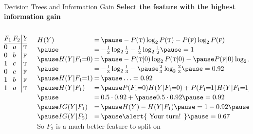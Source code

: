 \documentclass[12pt]{beamer}
\newcommand{\key}[1]{{\color{blue}#1}}
\newcommand{\SC}[1]{\mbox{\sc#1}}
\begin{document}
\begin{frame}{Decision Trees and Information Gain}
	\textbf{\key{Select the feature with the highest information gain}}
	\pause
	\medskip
	\begin{columns}[T]
		\begin{column}{0.6in}
			\small
			$
			\begin{array}{@{}l@{\hspace{2pt}}l@{\hspace{2pt}}|@{\hspace{2pt}}l@{}}
				F_1 & F_2 & Y \\
				\hline
				0   & a   & \SC{t} \\
				0   & b   & \SC{f} \\
				1   & c   & \SC{t} \\
				0   & c   & \SC{f} \\
				1   & b   & \SC{f} \\
				1   & a   & \SC{t} \\
			\end{array}
			$
		\end{column}
		\pause
		\begin{column}{3.8in}
			\small
			$
			\extrarowheight=2pt
			\begin{array}{@{}l@{\hspace{2pt}}l@{\hspace{2pt}}l@{}}
				H(Y)               & = & \pause -P(\SC{t})\log_2 P(\SC{t}) - P(\SC{f})\log_2 P(\SC{f}) \\
				\pause
				                   & = & -\frac{1}{2}\log_2 \frac{1}{2} - \frac{1}{2}\log_2 \frac{1}{2} \pause = 1 \\
				\pause
				H(Y|F_1\!\!=\!\!0) & = & \pause -P(\SC{t}|0)\log_2 P(\SC{t}|0) - \pause P(\SC{f}|0)\log_2 P(\SC{f}|0) \\
				\pause
				                   & = & - \frac{1}{3}\log_2 \frac{1}{3} - \pause \frac{2}{3}\log_2 \frac{2}{3} \pause = 0.92\\
				\pause         
				H(Y|F_1\!\!=\!\!1) & = & \pause \ldots = 0.92\\
				\pause         
				H(Y|F_1)           & = & \pause P(F_1\!\!=\!\!0) H(Y|F_1\!\!=\!\!0) + P(F_1\!\!=\!\!1) H(Y|F_1\!\!=\!\!1) \\
				\pause         
				                   & = & 0.5 \cdot 0.92 + \pause 0.5 \cdot 0.92 \pause = 0.92 \\
				\pause
				IG(Y|F_1)          & = & \pause H(Y) - H(Y|F_1) \pause = 1 - 0.92 \pause = 0.08 \\
				\pause         
				IG(Y|F_2)          & = & \pause \mbox{\alert{ Your turn! }} \pause = 0.67 \\
			\end{array}
			$ \\
			\medskip
			\pause
			So $F_2$ is a much better feature to split on \hyperlink{decision-tree-exercise<2>}{}
		\end{column}
	\end{columns}
\end{frame}
\end{document}
